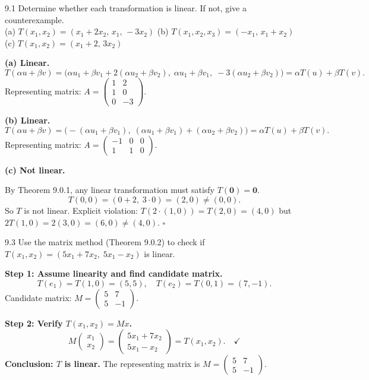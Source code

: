 \begin{exercise}{9.1}
Determine whether each transformation is linear. If not, give a counterexample.\\
(a) $T(x_1,x_2)=(x_1+2x_2,\,x_1,\,-3x_2)$\quad
(b) $T(x_1,x_2,x_3)=(-x_1,\,x_1+x_2)$\quad
(c) $T(x_1,x_2)=(x_1+2,\,3x_2)$
\end{exercise}
\begin{solution}
\textbf{(a) Linear.}
\[
T(\alpha u+\beta v)
=\bigl(\alpha u_1+\beta v_1+2(\alpha u_2+\beta v_2),\;\alpha u_1+\beta v_1,\;-3(\alpha u_2+\beta v_2)\bigr)
=\alpha T(u)+\beta T(v).
\]
Representing matrix: $A=\begin{pmatrix}1&2\\1&0\\0&-3\end{pmatrix}$.

\textbf{(b) Linear.}
\[
T(\alpha u+\beta v)=\bigl(-(\alpha u_1+\beta v_1),\;(\alpha u_1+\beta v_1)+(\alpha u_2+\beta v_2)\bigr)
=\alpha T(u)+\beta T(v).
\]
Representing matrix: $A=\begin{pmatrix}-1&0&0\\1&1&0\end{pmatrix}$.

\textbf{(c) Not linear.}

By Theorem 9.0.1, any linear transformation must satisfy $T(\mathbf{0})=\mathbf{0}$.
\[
T(0,0)=(0+2,\;3\cdot 0)=(2,0)\neq(0,0).
\]
So $T$ is not linear. Explicit violation: $T(2\cdot(1,0))=T(2,0)=(4,0)$ but $2T(1,0)=2(3,0)=(6,0)\neq(4,0)$. $\square$
\end{solution}

\begin{exercise}{9.3}
Use the matrix method (Theorem 9.0.2) to check if $T(x_1,x_2)=(5x_1+7x_2,\;5x_1-x_2)$ is linear.
\end{exercise}
\begin{solution}
\textbf{Step 1: Assume linearity and find candidate matrix.}
\[
T(e_1)=T(1,0)=(5,5),\quad T(e_2)=T(0,1)=(7,-1).
\]
Candidate matrix: $M=\begin{pmatrix}5&7\\5&-1\end{pmatrix}$.

\textbf{Step 2: Verify $T(x_1,x_2)=Mx$.}
\[
M\begin{pmatrix}x_1\\x_2\end{pmatrix}=\begin{pmatrix}5x_1+7x_2\\5x_1-x_2\end{pmatrix}=T(x_1,x_2).\quad\checkmark
\]
\textbf{Conclusion: $T$ is linear.} The representing matrix is $M=\begin{pmatrix}5&7\\5&-1\end{pmatrix}$.
\end{solution}

